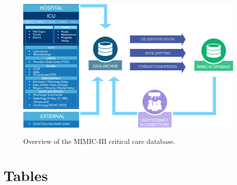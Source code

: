 \documentclass[english]{article}
\begin{document}
\begin{center}
\begin{figure}
\caption{Overview of the MIMIC-III critical care database.}
\includegraphics[width=\textwidth]{mimic.png}
\label{fig:mimicoverview}
\end{figure}
\end{center}

\section*{Tables}




\end{document}
